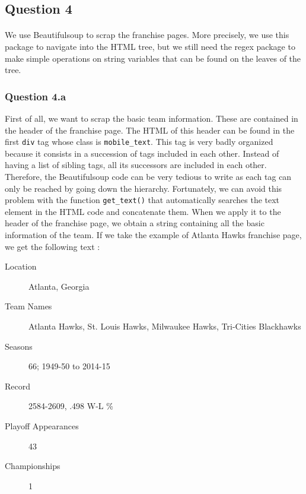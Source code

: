 
\subsection{Question 4}
\label{subsec:314}
\paragraph{}We use Beautifulsoup to scrap the franchise pages. More precisely, we use this package to navigate into the HTML tree, but we still need the regex package to make simple operations on string variables that can be found on the leaves of the tree.

\subsubsection{Question 4.a}
\label{subsubsec:314a}
First of all, we want to scrap the basic team information. These are contained in the header of the franchise page. The HTML of this header can be found in the first \verb|div| tag whose class is \verb|mobile_text|. This tag is very badly organized because it consists in a succession of tags included in each other. Instead of having a list of sibling tags, all its successors are included in each other. Therefore, the Beautifulsoup code can be very tedious to write as each tag can only be reached by going down the hierarchy. Fortunately, we can avoid this problem with the function \verb|get_text()| that automatically searches the text element in the HTML code and concatenate them. When we apply it to the header of the franchise page, we obtain a string containing all the basic information of the team. If we take the example of Atlanta Hawks franchise page, we get the following text :
\begin{description}
	\item[Location] Atlanta, Georgia 
	\item [Team Names] Atlanta Hawks, St. Louis Hawks, Milwaukee Hawks, Tri-Cities Blackhawks
	\item [Seasons] 66; 1949-50 to 2014-15
	\item [Record] 2584-2609, .498 W-L \%
	\item [Playoff Appearances] 43
	\item [Championships] 1
\end{description}

